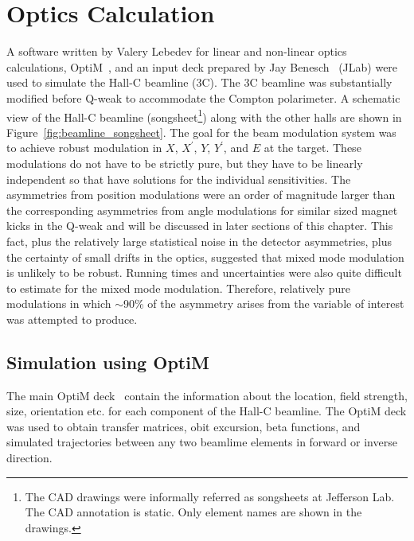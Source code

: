 \section{Optics Calculation}
\label{Optics Calculation}
A software written by Valery Lebedev for linear and non-linear optics calculations, OptiM~\cite{OPTIM}, and an input deck prepared by Jay Benesch~\cite{jay_communication} (JLab) were used to simulate the Hall-C beamline (3C). The 3C beamline was substantially modified before Q-weak to accommodate the Compton polarimeter. A schematic view of the Hall-C beamline (songsheet\footnote{The CAD drawings were informally referred as songsheets at Jefferson Lab. The CAD annotation is static. Only element names are shown in the drawings.}) along with the other halls are shown in Figure~\ref{fig:beamline_songsheet}.
The goal for the beam modulation system was to achieve robust modulation in $X$, $X^{'}$, $Y$, $Y^{'}$, and $E$ at the target. These modulations do not have to be strictly pure, but they have to be linearly independent so that have solutions for the individual sensitivities. The asymmetries from position modulations were an order of magnitude larger than the corresponding asymmetries from angle modulations for similar sized magnet kicks in the Q-weak and will be discussed in later sections of this chapter.
This fact, plus the relatively large statistical noise in the detector asymmetries, plus the certainty of small drifts in the optics, suggested that mixed mode modulation is unlikely to be robust. Running times and uncertainties were also quite difficult to estimate for the mixed mode modulation. Therefore, relatively pure modulations in which $\sim$90\% of the asymmetry arises from the variable of interest was attempted to produce.

\subsection{Simulation using OptiM}
\label{Simulation using OptiM}
The main OptiM deck~\cite{optim_deck} contain the information about the location, field strength, size, orientation etc. for each component of the Hall-C beamline.
The OptiM deck was used to obtain transfer matrices, obit excursion, beta functions, and simulated trajectories between any two beamlime elements in forward or inverse direction.

